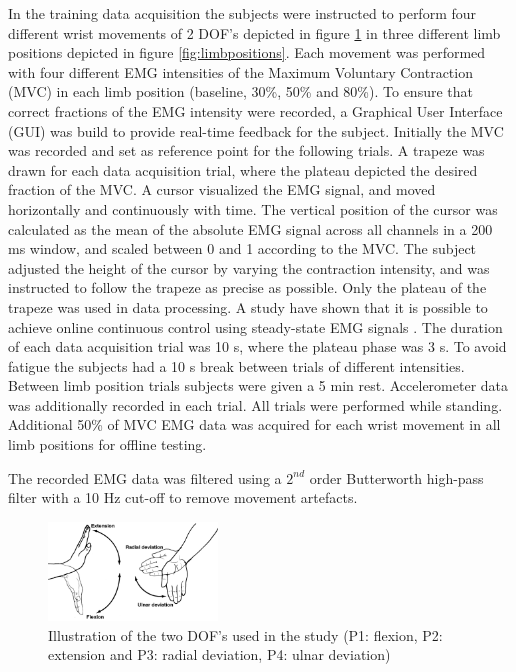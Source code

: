 In the training data acquisition the subjects were instructed to perform four different wrist movements of 2 DOF's depicted in figure \ref{fig:wristmovement} in three different limb positions depicted in figure \ref{fig:limbpositions}. Each movement was performed with four different EMG intensities of the Maximum Voluntary Contraction (MVC) in each limb position (baseline, 30\%, 50\% and 80\%). To ensure that correct fractions of the EMG intensity were recorded, a Graphical User Interface (GUI) was build to provide real-time feedback for the subject. Initially the MVC was recorded and set as reference point for the following trials. A trapeze was drawn for each data acquisition trial, where the plateau depicted the desired fraction of the MVC. A cursor visualized the EMG signal, and moved horizontally and continuously with time. The vertical position of the cursor was calculated as the mean of the absolute EMG signal across all channels in a 200 ms window, and scaled between 0 and 1 according to the MVC. The subject adjusted the height of the cursor by varying the contraction intensity, and was instructed to follow the trapeze as precise as possible. Only the plateau of the trapeze was used in data processing. A study have shown that it is possible to achieve online continuous control using steady-state EMG signals \cite{mobarak2014}. The duration of each data acquisition trial was 10 s, where the plateau phase was 3 s. To avoid fatigue the subjects had a 10 s break between trials of different intensities. Between limb position trials subjects were given a 5 min rest. Accelerometer data was additionally recorded in each trial. All trials were performed while standing.
Additional 50\% of MVC EMG data was acquired for each wrist movement in all limb positions for offline testing.

The recorded EMG data was filtered using a $2^{nd}$ order Butterworth high-pass filter with a 10 Hz cut-off to remove movement artefacts. 

\begin{figure}[thpb]
	\centering
	\includegraphics[width=0.4\textwidth]{Figures/wristmovement}  %
	\caption{Illustration of the two DOF's used in the study (P1: flexion, P2: extension and P3: radial deviation, P4: ulnar deviation)}
	\label{fig:wristmovement}  %
\end{figure}

